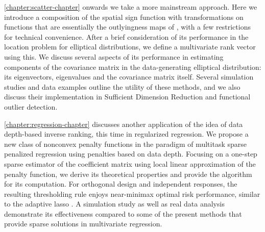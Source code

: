 \ref{chapter:scatter-chapter} onwards we take a more mainstream approach. Here we introduce a composition of the spatial sign function \citep{LocantoreEtal99} with transformations on functions that are essentially the outlyingness maps of \cite{zuo00}, with a few restrictions for technical convenience. After a brief consideration of its performance in the location problem for elliptical distributions, we define a multivariate rank vector using this. We discuss several aspects of its performance in estimating components of the covariance matrix in the data-generating elliptical distribution: its eigenvectors, eigenvalues and the covariance matrix itself. Several simulation studies and data examples outline the utility of these methods, and we also discuss their implementation in Sufficient Dimension Reduction \citep{AdragniCook09} and functional outlier detection.

\ref{chapter:regression-chapter} discusses another application of the idea of data depth-based inverse ranking, this time in regularized regression. We propose a new class of nonconvex penalty functions in the paradigm of multitask sparse penalized regression using penalties based on data depth. Focusing on a one-step sparse estimator of the coefficient matrix using local linear approximation of the penalty function, we derive its theoretical properties and provide the algorithm for its computation. For orthogonal design and independent responses, the resulting thresholding rule enjoys near-minimax optimal risk performance, similar to the adaptive lasso \citep{Zou06}. A simulation study as well as real data analysis demonstrate its effectiveness compared to some of the present methods that provide sparse solutions in multivariate regression.

